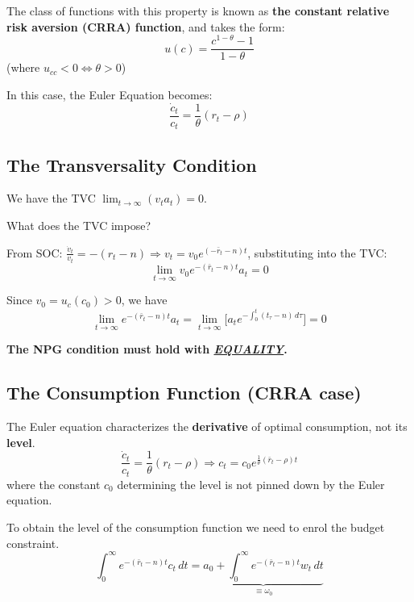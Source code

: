 \begin{example*}
    The class of functions with this property is known as \textbf{the constant relative risk aversion (CRRA) function}, and takes the form: \[
        u(c) = \frac{c^{1-\theta} - 1}{1- \theta}
    \] (where $u_{cc} < 0 \iff \theta > 0$)

    In this case, the Euler Equation becomes: \[
        \frac{\dot{c}_t}{c_t} = \frac{1}{\theta}(r_t-\rho)
    \]
\end{example*}



\subsection{The Transversality Condition}

We have the TVC $\lim_{t \to \infty} (v_ta_t) = 0$.

\noindent What does the TVC impose?

From SOC: $\frac{\dot{v}_t}{v_t} = -(r_t - n) \Longrightarrow v_t = v_0e^{(-\bar{r}_t - n)t}$, substituting into the TVC:
\[
    \lim_{t \to \infty} v_0e^{-(\bar{r}_t - n)t}a_t = 0
\]

Since $v_0 = u_c(c_0) > 0$, we have \[
    \lim_{t \to \infty} e^{-(\bar{r}_t - n)t}a_t = \lim_{t \to \infty} \Big[a_t e^{-\int_{0}^{t} (t_{\tau}-n) \, d\tau}\Big] = 0
\]

\textbf{The NPG condition  must hold with \textit{\underline{\uppercase{equality}}}.}

\subsection{The Consumption Function (CRRA case)}

The Euler equation characterizes the \textbf{derivative} of optimal consumption, not its \textbf{level}.
\[
    \frac{\dot{c}_t}{c_t} = \frac{1}{\theta}(r_t-\rho) \Longrightarrow c_t = c_0 e^{\frac{1}{\theta}(\bar{r}_t - \rho)t}
\] where the constant $c_0$ determining the level is not pinned down by the Euler equation.

To obtain the level of the consumption function we need to enrol the budget constraint.
\[
    {\int_{0}^{\infty } e^{-(\bar{r}_t-n)t}c_t \, dt} = \underbrace{a_0 + \int_{0}^{\infty } e^{-(\bar{r}_t-n)t}w_t \, dt}_{\equiv \omega_0}
\]

